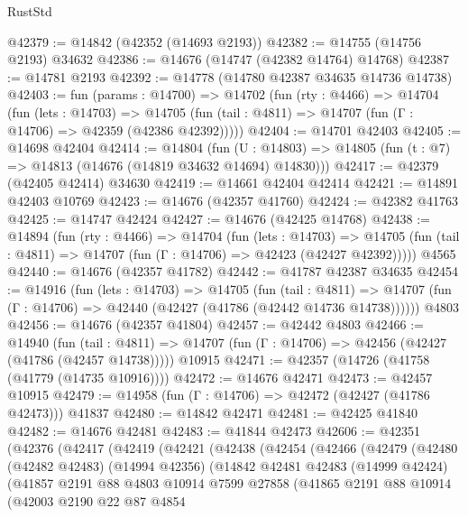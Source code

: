 \begin{lexlean}{RustStd}
\begin{coremodule}
@42379 := @14842 (@42352 (@14693 @2193))
@42382 := @14755 (@14756 @2193) @34632
@42386 := @14676 (@14747 (@42382 @14764) @14768)
@42387 := @14781 @2193
@42392 := @14778 (@14780 @42387 @34635 @14736 @14738)
@42403 := fun (params : @14700) =>
  @14702
    (fun (rty : @4466) =>
    @14704
      (fun (lets : @14703) =>
      @14705 (fun (tail : @4811) => @14707 (fun (Γ : @14706) => @42359 (@42386 @42392)))))
@42404 := @14701 @42403
@42405 := @14698 @42404
@42414 := @14804
    (fun (U : @14803) => @14805 (fun (t : @7) => @14813 (@14676 (@14819 @34632 @14694) @14830)))
@42417 := @42379 (@42405 @42414) @34630
@42419 := @14661 @42404 @42414
@42421 := @14891 @42403 @10769
@42423 := @14676 (@42357 @41760)
@42424 := @42382 @41763
@42425 := @14747 @42424
@42427 := @14676 (@42425 @14768)
@42438 := @14894
    (fun (rty : @4466) =>
    @14704
      (fun (lets : @14703) =>
      @14705 (fun (tail : @4811) => @14707 (fun (Γ : @14706) => @42423 (@42427 @42392)))))
    @4565
@42440 := @14676 (@42357 @41782)
@42442 := @41787 @42387 @34635
@42454 := @14916
    (fun (lets : @14703) =>
    @14705
      (fun (tail : @4811) =>
      @14707 (fun (Γ : @14706) => @42440 (@42427 (@41786 (@42442 @14736 @14738))))))
    @4803
@42456 := @14676 (@42357 @41804)
@42457 := @42442 @4803
@42466 := @14940
    (fun (tail : @4811) => @14707 (fun (Γ : @14706) => @42456 (@42427 (@41786 (@42457 @14738)))))
    @10915
@42471 := @42357 (@14726 (@41758 (@41779 (@14735 @10916))))
@42472 := @14676 @42471
@42473 := @42457 @10915
@42479 := @14958 (fun (Γ : @14706) => @42472 (@42427 (@41786 @42473))) @41837
@42480 := @14842 @42471
@42481 := @42425 @41840
@42482 := @14676 @42481
@42483 := @41844 @42473
@42606 := @42351
    (@42376
      (@42417
        (@42419
          (@42421
            (@42438
              (@42454
                (@42466
                  (@42479
                    (@42480
                      (@42482 @42483)
                      (@14994 @42356)
                      (@14842
                        @42481
                        @42483
                        (@14999 @42424)
                        (@41857
                          @2191
                          @88
                          @4803
                          @10914
                          @7599
                          @27858
                          (@41865
                            @2191
                            @88
                            @10914
                            (@42003
                              @2190
                              @22
                              @87
                              @4854

\end{coremodule}
\end{lexlean}

